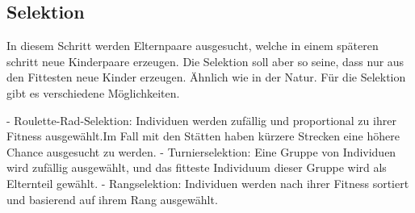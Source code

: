 %
%
%
%
\subsection{Selektion 
\label{genetic_algorithm:selection}}
In diesem Schritt werden Elternpaare ausgesucht, welche 
in einem späteren schritt neue Kinderpaare erzeugen. Die 
Selektion soll aber so seine, dass nur aus den Fittesten 
neue Kinder erzeugen. Ähnlich wie in der Natur. Für die Selektion
gibt es verschiedene Möglichkeiten.

- Roulette-Rad-Selektion: Individuen werden zufällig und proportional 
zu ihrer Fitness ausgewählt.Im Fall mit den Stätten haben kürzere 
Strecken eine höhere Chance ausgesucht zu werden.
- Turnierselektion: Eine Gruppe von Individuen wird zufällig 
ausgewählt, und das fitteste Individuum dieser Gruppe wird 
als Elternteil gewählt.
- Rangselektion: Individuen werden nach ihrer Fitness sortiert 
und basierend auf ihrem Rang ausgewählt.


